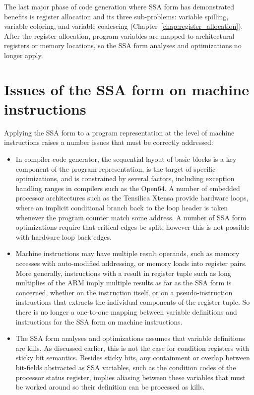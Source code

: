 The last major phase of code generation where SSA form has demonstrated benefits
is register allocation and its three sub-problems: variable spilling, variable
coloring, and variable coalescing (Chapter~\ref{chap:register_allocation}). After
the register allocation, program variables are mapped to architectural registers
or memory locations, so the SSA form analyses and optimizations no longer apply.

\section{Issues of the SSA form on machine instructions}

Applying the SSA form to a program representation at the level of machine
instructions raises a number issues that must be correctly addressed:
\begin{itemize}

\item In compiler code generator, the sequential layout of basic blocks is a key
component of the program representation, is the target of specific
optimizations, and is constrained by several factors, including exception
handling ranges in compilers such as the Open64. A number of embedded processor
architectures such as the Tensilica Xtensa provide hardware loops, where an
implicit conditional branch back to the loop header is taken whenever the
program counter match some address. A number of SSA form optimizations require
that critical edges be split, however this is not possible with hardware loop
back edges.

\item Machine instructions may have multiple result operands, such as memory
accesses with auto-modified addressing, or memory loads into register pairs.
More generally, instructions with a result in register tuple such as long
multiplies of the ARM imply multiple results as far as the SSA form is
concerned, whether on the instruction itself, or on a pseudo-instruction
instructions that extracts the individual components of the register tuple. So
there is no longer a one-to-one mapping between variable definitions and
instructions for the SSA form on machine instructions.

\item The SSA form analyses and optimizations assumes that variable definitions
are kills. As discussed earlier, this is not the case for condition registers
with sticky bit semantics. Besides sticky bits, any containment or overlap
between bit-fields abstracted as SSA variables, such as the condition codes of
the processor status register, implies aliasing between these variables that
must be worked around so their definition can be processed as kills.


\end{itemize}
